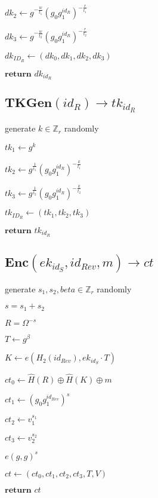 \documentclass[a4paper]{article}
\begin{document}
$\textit{dk}_2 \gets g^{-\frac{w}{t_1}}(g_0 g_1^{\textit{id}_R})^{-\frac{r}{t_1}}$

$\textit{dk}_3 \gets g^{-\frac{w}{t_2}}(g_0 g_1^{\textit{id}_R})^{-\frac{r}{t_2}}$

$\textit{dk}_{\textit{ID}_R} \gets (\textit{dk}_0, \textit{dk}_1, \textit{dk}_2, \textit{dk}_3)$

$\textbf{return }\textit{dk}_{\textit{id}_R}$

\subsection{$\textbf{TKGen}(\textit{id}_R) \rightarrow \textit{tk}_{\textit{id}_R}$}

generate $k \in \mathbb{Z}_r$ randomly

$\textit{tk}_1 \gets g^k$

$\textit{tk}_2 \gets g^{\frac{1}{t_1}}(g_0 g_1^{\textit{id}_R})^{-\frac{k}{t_1}}$

$\textit{tk}_3 \gets g^{\frac{1}{t_2}}(g_0 g_1^{\textit{id}_R})^{-\frac{k}{t_2}}$

$\textit{tk}_{\textit{ID}_R} \gets (\textit{tk}_1, \textit{tk}_2, \textit{tk}_3)$

$\textbf{return }\textit{tk}_{\textit{id}_R}$

\subsection{$\textbf{Enc}(\textit{ek}_{\textit{id}_S}, \textit{id}_\textit{Rev}, m) \rightarrow \textit{ct}$}

generate $s_1, s_2, beta \in \mathbb{Z}_r$ randomly

$s = s_1 + s_2$

$R = \Omega^{-s}$

$T \gets g^\beta$

$K \gets e(H_2(\textit{id}_\textit{Rev}), \textit{ek}_{\textit{id}_S} \cdot T)$

$\textit{ct}_0 \gets \hat{H}(R) \oplus \hat{H}(K) \oplus m$

$\textit{ct}_1 \gets (g_0 g_1^{\textit{id}_\textit{Rev}})^s$

$\textit{ct}_2 \gets v_1^{s_1}$

$\textit{ct}_3 \gets v_2^{s_2}$

$e(g, g)^s$

$\textit{ct} \gets (\textit{ct}_0, \textit{ct}_1, \textit{ct}_2, \textit{ct}_3, T, V)$

$\textbf{return }\textit{ct}$
\end{document}
